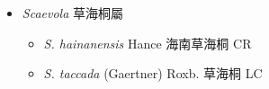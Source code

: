 
  \begin{itemize}
 \item[] \textit{Scaevola} 草海桐屬
                                
  \begin{itemize}
        \item[] \textit{S. hainanensis} Hance  海南草海桐   CR
        \item[] \textit{S. taccada} (Gaertner) Roxb.  草海桐   LC
  \end{itemize}
  \end{itemize}
